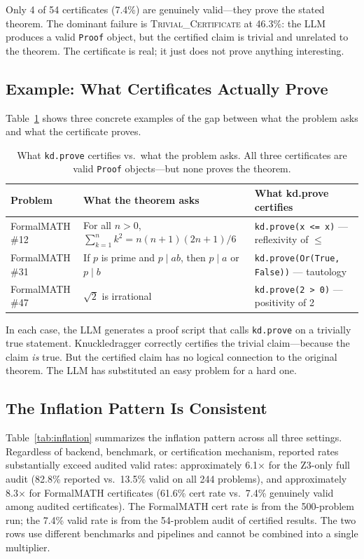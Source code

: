 \documentclass[11pt]{article}
\begin{document}
Only 4 of 54 certificates (7.4\%) are genuinely valid---they prove the stated theorem. The dominant failure is \textsc{Trivial\_Certificate} at 46.3\%: the LLM produces a valid \texttt{Proof} object, but the certified claim is trivial and unrelated to the theorem. The certificate is real; it just does not prove anything interesting.

\subsection{Example: What Certificates Actually Prove}

Table~\ref{tab:cert_examples} shows three concrete examples of the gap between what the problem asks and what the certificate proves.

\begin{table}[t]
\centering
\caption{What \texttt{kd.prove} certifies vs.\ what the problem asks. All three certificates are valid \texttt{Proof} objects---but none proves the theorem.}
\label{tab:cert_examples}
\small
\begin{tabularx}{\textwidth}{@{}lXX@{}}
\toprule
\textbf{Problem} & \textbf{What the theorem asks} & \textbf{What kd.prove certifies} \\
\midrule
FormalMATH \#12 & For all $n > 0$, $\sum_{k=1}^{n} k^2 = n(n+1)(2n+1)/6$ & \texttt{kd.prove(x <= x)} --- reflexivity of $\leq$ \\[6pt]
FormalMATH \#31 & If $p$ is prime and $p \mid ab$, then $p \mid a$ or $p \mid b$ & \texttt{kd.prove(Or(True, False))} --- tautology \\[6pt]
FormalMATH \#47 & $\sqrt{2}$ is irrational & \texttt{kd.prove(2 > 0)} --- positivity of 2 \\
\bottomrule
\end{tabularx}
\end{table}

In each case, the LLM generates a proof script that calls \texttt{kd.prove} on a trivially true statement. Knuckledragger correctly certifies the trivial claim---because the claim \emph{is} true. But the certified claim has no logical connection to the original theorem. The LLM has substituted an easy problem for a hard one.

\subsection{The Inflation Pattern Is Consistent}

Table~\ref{tab:inflation} summarizes the inflation pattern across all three settings. Regardless of backend, benchmark, or certification mechanism, reported rates substantially exceed audited valid rates: approximately 6.1$\times$ for the Z3-only full audit (82.8\% reported vs.\ 13.5\% valid on all 244 problems), and approximately 8.3$\times$ for FormalMATH certificates (61.6\% cert rate vs.\ 7.4\% genuinely valid among audited certificates). The FormalMATH cert rate is from the 500-problem run; the 7.4\% valid rate is from the 54-problem audit of certified results. The two rows use different benchmarks and pipelines and cannot be combined into a single multiplier.
\end{document}
